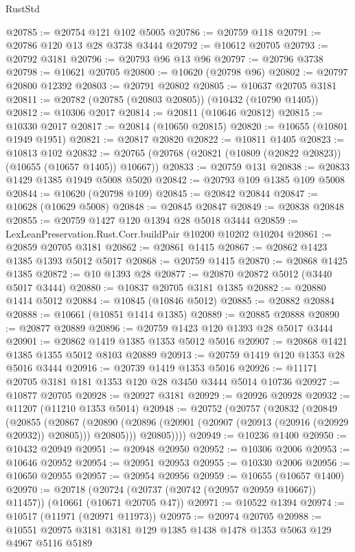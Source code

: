 \begin{lexlean}{RustStd}
\begin{coremodule}
@20785 := @20754 @121 @102 @5005
@20786 := @20759 @118
@20791 := @20786 @120 @13 @28 @3738 @3444
@20792 := @10612 @20705
@20793 := @20792 @3181
@20796 := @20793 @96 @13 @96
@20797 := @20796 @3738
@20798 := @10621 @20705
@20800 := @10620 (@20798 @96)
@20802 := @20797 @20800 @12392
@20803 := @20791 @20802
@20805 := @10637 @20705 @3181
@20811 := @20782 (@20785 (@20803 @20805)) (@10432 (@10790 @1405))
@20812 := @10306 @2017
@20814 := @20811 (@10646 @20812)
@20815 := @10330 @2017
@20817 := @20814 (@10650 @20815)
@20820 := @10655 (@10801 @1949 @1951)
@20821 := @20817 @20820
@20822 := @10811 @1405
@20823 := @10813 @102
@20832 := @20765 (@20768 (@20821 (@10809 (@20822 @20823)) (@10655 (@10657 @1405)) @10667))
@20833 := @20759 @131
@20838 := @20833 @1429 @1385 @1949 @5008 @5020
@20842 := @20793 @109 @1385 @109 @5008
@20844 := @10620 (@20798 @109)
@20845 := @20842 @20844
@20847 := @10628 (@10629 @5008)
@20848 := @20845 @20847
@20849 := @20838 @20848
@20855 := @20759 @1427 @120 @1394 @28 @5018 @3444
@20859 := LexLeanPreservation.Rust.Corr.buildPair @10200 @10202 @10204
@20861 := @20859 @20705 @3181
@20862 := @20861 @1415
@20867 := @20862 @1423 @1385 @1393 @5012 @5017
@20868 := @20759 @1415
@20870 := @20868 @1425 @1385
@20872 := @10 @1393 @28
@20877 := @20870 @20872 @5012 (@3440 @5017 @3444)
@20880 := @10837 @20705 @3181 @1385
@20882 := @20880 @1414 @5012
@20884 := @10845 (@10846 @5012)
@20885 := @20882 @20884
@20888 := @10661 (@10851 @1414 @1385)
@20889 := @20885 @20888
@20890 := @20877 @20889
@20896 := @20759 @1423 @120 @1393 @28 @5017 @3444
@20901 := @20862 @1419 @1385 @1353 @5012 @5016
@20907 := @20868 @1421 @1385 @1355 @5012 @8103 @20889
@20913 := @20759 @1419 @120 @1353 @28 @5016 @3444
@20916 := @20739 @1419 @1353 @5016
@20926 := @11171 @20705 @3181 @181 @1353 @120 @28 @3450 @3444 @5014 @10736
@20927 := @10877 @20705
@20928 := @20927 @3181
@20929 := @20926 @20928
@20932 := @11207 (@11210 @1353 @5014)
@20948 := @20752
    (@20757
      (@20832
        (@20849
          (@20855
            (@20867
              (@20890 (@20896 (@20901 (@20907 (@20913 (@20916 (@20929 @20932)) @20805))) @20805)))
            @20805))))
@20949 := @10236 @1400
@20950 := @10432 @20949
@20951 := @20948 @20950
@20952 := @10306 @2006
@20953 := @10646 @20952
@20954 := @20951 @20953
@20955 := @10330 @2006
@20956 := @10650 @20955
@20957 := @20954 @20956
@20959 := @10655 (@10657 @1400)
@20970 := @20718
    (@20724 (@20737 (@20742 (@20957 @20959 @10667)) @11457))
    (@10661 (@10671 @20705 @47))
@20971 := @10522 @1394
@20974 := @10517 (@11971 (@20971 @11973))
@20975 := @20974 @20705
@20988 := @10551 @20975 @3181 @3181 @129 @1385 @1438 @1478 @1353 @5063 @129 @4967 @5116 @5189

\end{coremodule}
\end{lexlean}
